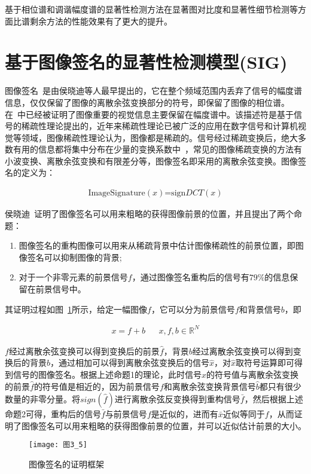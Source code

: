 基于相位谱和调谐幅度谱的显著性检测方法在显著图对比度和显著性细节检测等方面比谱剩余方法的性能效果有了更大的提升。

\section{基于图像签名的显著性检测模型(SIG)}
\label{3_5}
图像签名~\cite{HouXiaodiTPAMI2012Signature}是由侯晓迪等人最早提出的，它在整个频域范围内丢弃了信号的幅度谱信息，仅仅保留了图像的离散余弦变换部分的符号，即保留了图像的相位谱。在~\cite{Hou2014Phd}中已经被证明了图像重要的视觉信息主要保留在幅度谱中。该描述符是基于信号的稀疏性理论提出的，近年来稀疏性理论已被广泛的应用在数字信号和计算机视觉等领域，图像稀疏性理论认为，图像都是稀疏的。信号经过稀疏变换后，绝大多数有用的信息都将集中分布在少量的变换系数中~\cite{郑源彩2012稀疏}，常见的图像稀疏变换的方法有小波变换、离散余弦变换和有限差分等，图像签名即采用的离散余弦变换。图像签名的定义为：
\begin{linenomath}
\begin{align}
\textrm{ImageSignature$(x)$=sign$DCT(x)$}
\label{式3_27}
\end{align}
\end{linenomath}

侯晓迪~\cite{HouXiaodiTPAMI2012Signature}证明了图像签名可以用来粗略的获得图像前景的位置，并且提出了两个命题：
\begin{enumerate}
\item 图像签名的重构图像可以用来从稀疏背景中估计图像稀疏性的前景位置，即图像签名可以抑制图像的背景;
\item 对于一个非零元素的前景信号$f$，通过图像签名重构后的信号有$79\%$的信息保留在前景信号中。
\end{enumerate}
其证明过程如图~\ref{图3_5}所示，给定一幅图像$f$，它可以分为前景信号$f$和背景信号$b$，即
\begin{linenomath}
\begin{align}
x=f+b&&x,f,b\in\mathbb{R}^{N}
\label{式3_28}
\end{align}
\end{linenomath}
$f$经过离散余弦变换可以得到变换后的前景$\hat{f}$，背景$b$经过离散余弦变换可以得到变换后的背景$\hat{b}$，通过相加可以得到离散余弦变换后的信号$\hat{x}$，对$\hat{x}$取符号运算即可得到信号的图像签名。根据上述命题1的理论，此时信号$\hat{x}$的符号值与离散余弦变换的前景$\hat{f}$的符号值是相近的，因为前景信号$f$和离散余弦变换背景信号$\hat{b}$都只有很少数量的非零分量。将$sign(\hat{f})$进行离散余弦反变换得到重构信号$\bar{f}$，然后根据上述命题2可得，重构后的信号$\bar{f}$与前景信号$f$是近似的，进而有$\bar{x}$近似等同于$f$，从而证明了图像签名可以用来粗略的获得图像前景的位置，并可以近似估计前景的大小。
\begin{figure}[h] %
\centering
\texttt{[image: 图3\_5]}
\caption{图像签名的证明框架~\cite{HouXiaodiTPAMI2012Signature}}
\label{图3_5}
\end{figure}

